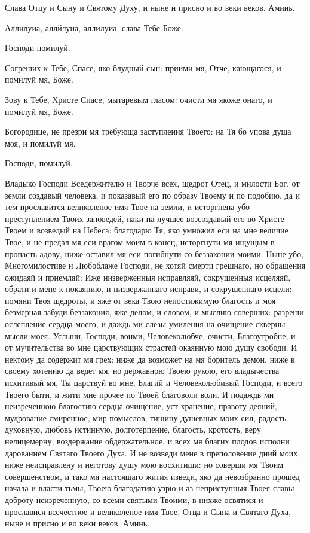 \begin{mymulticols}
Слава Отцу и Сыну и Святому Духу, и ныне и присно и во веки веков. Аминь. 

Аллилуиа, аллйлуиа, аллилуиа, слава Тебе Боже.  

Господи помилуй. 


\TrisviatoePoOtcheNash


Согреших к Тебе, Спасе, яко блудный сын: приими мя, Отче, кающагося, и помилуй мя, Боже. 

\slavan

Зову к Тебе, Христе Спасе, мытаревым гласом: очисти мя якоже онаго, и помилуй мя, Боже. 

\inynen

 Богородице, не презри мя требующа заступления Твоего: на Тя бо упова душа моя, и помилуй мя. 

Господи, помилуй. 


Владыко Господи Вседержителю и Творче всех, щедрот Отец, и милости Бог, от земли создавый человека, и показавый его по образу Твоему и по подобию, да и тем прославится великолепое имя Твое на земли, и исторгнена убо преступлением Твоих заповедей, паки на лучшее возсоздавый его во Христе Твоем и возведый на Небеса: благодарю Тя, яко умножил еси на мне величие Твое, и не предал мя еси врагом моим в конец, исторгнути мя ищущым в пропасть адову, ниже оставил мя еси погибнути со беззаконии моими. Ныне убо, Многомилостиве и Любоблаже Господи, не хотяй смерти грешнаго, но обращения ожидаяй и приемляй: Иже низверженныя исправляяй, сокрушенныя исцеляяй, обрати и мене к покаянию, и низвержаннаго исправи, и сокрушеннаго исцели: помяни Твоя щедроты, и яже от века Твою непостижимую благость и моя безмерная забуди беззакония, яже делом, и словом, и мыслию соверших: разреши ослепление сердца моего, и даждь ми слезы умиления на очищение скверны мысли моея. Усльши, Господи, вонми, Человеколюбче, очисти, Благоутробне, и от мучительства во мне царствующих страстей окаянную мою душу свободи. И нектому да содержит мя грех: ниже да возможет на мя боритель демон, ниже к своему хотению да ведет мя, но державною Твоею рукою, его владычества исхитивый мя, Ты царствуй во мне, Благий и Человеколюбивый Господи, и всего Твоего быти, и жити мне прочее по Твоей благоволи воли. И подаждь ми неизреченною благостию сердца очищение, уст хранение, правоту деяний, мудрование смиренное, мир помыслов, тишину душевных моих сил, радость духовную, любовь истинную, долготерпение, благость, кротость, веру нелицемерну, воздержание обдержательное, и всех мя благих плодов исполни дарованием Святаго Твоего Духа. И не возведи мене в преполовение дний моих, ниже неисправлену и неготову душу мою восхитиши: но соверши мя Твоим совершенством, и тако мя настоящаго жития изведи, яко да невозбранно прошед начала и власти тьмы, Твоею благодатию узрю и аз неприступныя Твоея славы доброту неизреченную, со всеми святыми Твоими, в нихже освятися и прославися всечестное и великолепое имя Твое, Отца и Сына и Святаго Духа, ныне и присно и во веки веков. Аминь.


\end{mymulticols}
